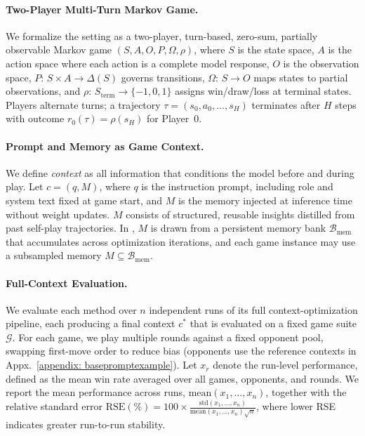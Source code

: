 \paragraph{Two-Player Multi-Turn Markov Game.}
We formalize the setting as a two-player, turn-based, zero-sum, partially observable Markov game $(S, A, O, P, \Omega, \rho)$, where $S$ is the state space, $A$ is the action space where each action is a complete model response, $O$ is the observation space, $P{:}\, S \times A \to \Delta(S)$ governs transitions, $\Omega{:}\, S \to O$ maps states to partial observations, and $\rho{:}\, S_{\text{term}} \to \{-1, 0, 1\}$ assigns win/draw/loss at terminal states. Players alternate turns; a trajectory $\tau = (s_0, a_0, \ldots, s_H)$ terminates after $H$ steps with outcome $r_0(\tau) = \rho(s_H)$ for Player~0.


\paragraph{Prompt and Memory as Game Context.}
We define \emph{context} as all information that conditions the model before and during play. Let $c=(q,M)$, where $q$ is the instruction prompt, including role and system text fixed at game start,
and $M$ is the memory injected at inference time without weight updates. $M$ consists of structured, reusable insights distilled from past self-play trajectories.
In \NAME{}, $M$ is drawn from a persistent memory bank $\mathcal{B}_{\text{mem}}$ that accumulates across
optimization iterations, and each game instance may use a subsampled memory $M\subseteq \mathcal{B}_{\text{mem}}$.

\paragraph{Full-Context Evaluation.}
\label{RSE}
We evaluate each method over $n$ independent runs of its full context-optimization pipeline, each producing a final context $c^*$ that is evaluated on a fixed game suite $\mathcal{G}$. For each game, we play multiple rounds against a fixed opponent pool, swapping first-move order to reduce bias (opponents use the reference contexts in Appx.~\ref{appendix: basepromptexample}). Let $x_r$ denote the run-level performance, defined as the mean win rate averaged over all games, opponents, and rounds. We report the mean performance across runs, $\mathrm{mean}(x_1,\ldots,x_n)$, together with the relative standard error $\mathrm{RSE}(\%) = 100 \times \frac{\mathrm{std}(x_1,\ldots,x_n)}{\mathrm{mean}(x_1,\ldots,x_n)\sqrt{n}}$, where lower RSE indicates greater run-to-run stability.
